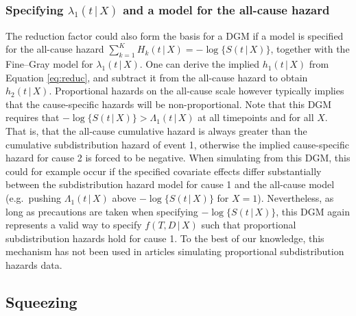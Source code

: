 \documentclass[
  letterpaper,
  DIV=11,
  numbers=noendperiod]{scrreprt}
\newcommand{\given}{\,|\,}
\begin{document}
\hypertarget{specifying-lambda_1t-given-x-and-a-model-for-the-all-cause-hazard}{%
\subsubsection{\texorpdfstring{Specifying \(\lambda_1(t \given X)\) and
a model for the all-cause
hazard}{Specifying \textbackslash lambda\_1(t \textbackslash given X) and a model for the all-cause hazard}}\label{specifying-lambda_1t-given-x-and-a-model-for-the-all-cause-hazard}}

The reduction factor could also form the basis for a DGM if a model is
specified for the all-cause hazard
\(\sum_{k = 1}^{K} H_k(t \given X) = -\log\{S(t \given X)\}\), together
with the Fine--Gray model for \(\lambda_1(t \given X)\). One can derive
the implied \(h_1(t \given X)\) from Equation \eqref{eq:reduc}, and
subtract it from the all-cause hazard to obtain \(h_2(t \given X)\).
Proportional hazards on the all-cause scale however typically implies
that the cause-specific hazards will be non-proportional. Note that this
DGM requires that \(-\log\{S(t \given X)\} > \Lambda_1(t \given X)\) at
all timepoints and for all \(X\). That is, that the all-cause cumulative
hazard is always greater than the cumulative subdistribution hazard of
event 1, otherwise the implied cause-specific hazard for cause 2 is
forced to be negative. When simulating from this DGM, this could for
example occur if the specified covariate effects differ substantially
between the subdistribution hazard model for cause 1 and the all-cause
model (e.g.~pushing \(\Lambda_1(t \given X)\) above
\(-\log\{S(t \given X)\}\) for \(X = 1\)). Nevertheless, as long as
precautions are taken when specifying \(-\log\{S(t \given X)\}\), this
DGM again represents a valid way to specify \(f(T, D \given X)\) such
that proportional subdistribution hazards hold for cause 1. To the best
of our knowledge, this mechanism has not been used in articles
simulating proportional subdistribution hazards data.

\hypertarget{squeezing}{%
\subsection{Squeezing}\label{squeezing}}
\end{document}
